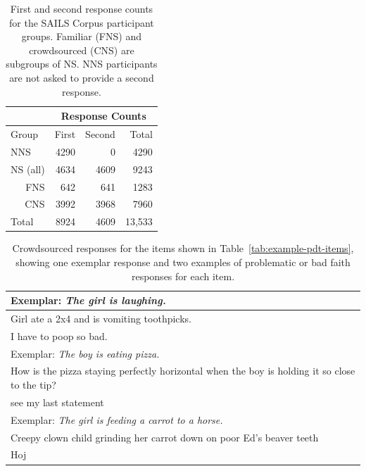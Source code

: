 \begin{table}[htb!]
\begin{center}
\begin{tabular}{|l||r|r||r|}
\hline
& \multicolumn{3}{|c|}{Response Counts} \\
\hline
 Group & First & Second & Total \\
\hline
\hline
NNS & 4290 & 0 & 4290 \\
\hline
\hline
NS (all) & 4634 & 4609 & 9243 \\ %
\hline
\multicolumn{1}{|r||}{FNS} & 642 & 641 & 1283 \\ 
\hline
\multicolumn{1}{|r||}{CNS} & 3992 & 3968 & 7960 \\
\hline
\hline
Total & 8924 & 4609 & 13,533 \\
\hline
\end{tabular}
\caption{\label{tab:response-counts} First and second response counts for the SAILS Corpus participant groups. Familiar (FNS) and crowdsourced (CNS) are subgroups of NS. NNS participants are not asked to provide a second response.}
\end{center}
\end{table}

\begin{table}[htb!]
\begin{center}
\begin{tabular}{|l|}
\hline
Exemplar: \textit{The girl is laughing.} \\
\hline
Girl ate a 2x4 and is vomiting toothpicks. \\
\hline
I have to poop so bad. \\
\hline
\hline
Exemplar: \textit{The boy is eating pizza.} \\
\hline
How is the pizza staying perfectly horizontal when the boy is holding it so close to the tip? \\
\hline
see my last statement \\
\hline
\hline
Exemplar: \textit{The girl is feeding a carrot to a horse.} \\
\hline
Creepy clown child grinding her carrot down on poor Ed's beaver teeth \\
\hline
Hoj \\
\hline
\end{tabular}
\caption{\label{tab:bad-faith} Crowdsourced responses for the items shown in Table~\ref{tab:example-pdt-items}, showing one exemplar response and two examples of problematic or bad faith responses for each item.}
\end{center}
\end{table}


